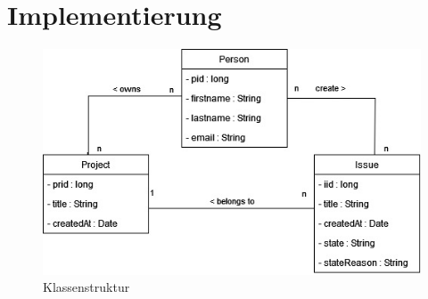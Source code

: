 \chapter{Implementierung} %
\label{sec:implementierung}
\begin{figure}[h!]
	\centering
	\includegraphics[scale=1]{Illustrations/class_diagram.jpg}
	\caption{Klassenstruktur}
\end{figure}

